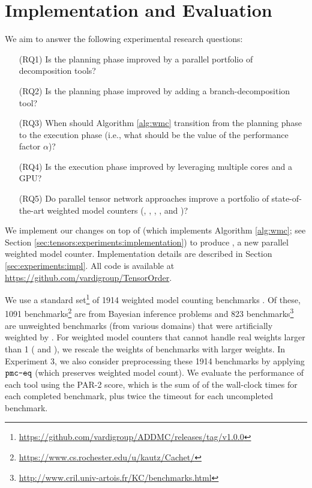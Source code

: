 \section{Implementation and Evaluation}
\label{sec:experiments}

We aim to answer the following experimental research questions:
\begin{enumerate}\itemsep0em 
    \item[(RQ1)] Is the planning phase improved by a parallel portfolio of decomposition tools?
    
    \item[(RQ2)] Is the planning phase improved by adding a branch-decomposition tool?
    
    \item[(RQ3)] When should Algorithm \ref{alg:wmc} transition from the planning phase to the execution phase (i.e., what should be the value of the performance factor $\alpha$)?
    
    \item[(RQ4)] Is the execution phase improved by leveraging multiple cores and a GPU?
    
    \item[(RQ5)] Do parallel tensor network approaches improve a portfolio of state-of-the-art weighted model counters (, , , , and )?
\end{enumerate}

We implement our changes on top of  (which implements Algorithm \ref{alg:wmc}; see Section \ref{sec:tensors:experiments:implementation}) to produce , a new parallel weighted model counter. Implementation details are described in Section \ref{sec:experiments:impl}. All code is available at  \url{https://github.com/vardigroup/TensorOrder}.

We use a standard set\footnote{\url{https://github.com/vardigroup/ADDMC/releases/tag/v1.0.0}} of 1914 weighted model counting benchmarks \cite{DPV20}. Of these, 1091 benchmarks\footnote{\url{https://www.cs.rochester.edu/u/kautz/Cachet/}} are from Bayesian inference problems \cite{SBK05} and 823 benchmarks\footnote{\url{http://www.cril.univ-artois.fr/KC/benchmarks.html}} are unweighted benchmarks (from various domains) that were artificially weighted by \cite{DPV20}. For weighted model counters that cannot handle real weights larger than 1 ( and ), we rescale the weights of benchmarks with larger weights. In Experiment 3, we also consider preprocessing these 1914 benchmarks by applying $\texttt{\upshape pmc-eq}$ \cite{LM14} (which preserves weighted model count). %
We evaluate the performance of each tool using the PAR-2 score, which is the sum of of the wall-clock times for each completed benchmark, plus twice the timeout for each uncompleted benchmark.

